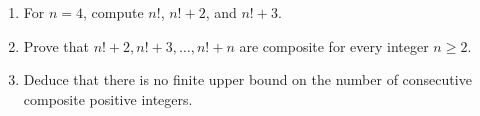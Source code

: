\begin{enumerate}\item For $n=4$, compute $n!$, $n!+2$, and $n!+3$.\item Prove that $n!+2,n!+3,\ldots,n!+n$ are composite for every integer $n\ge2$.\item Deduce that there is no finite upper bound on the number of consecutive composite positive integers.\end{enumerate}
